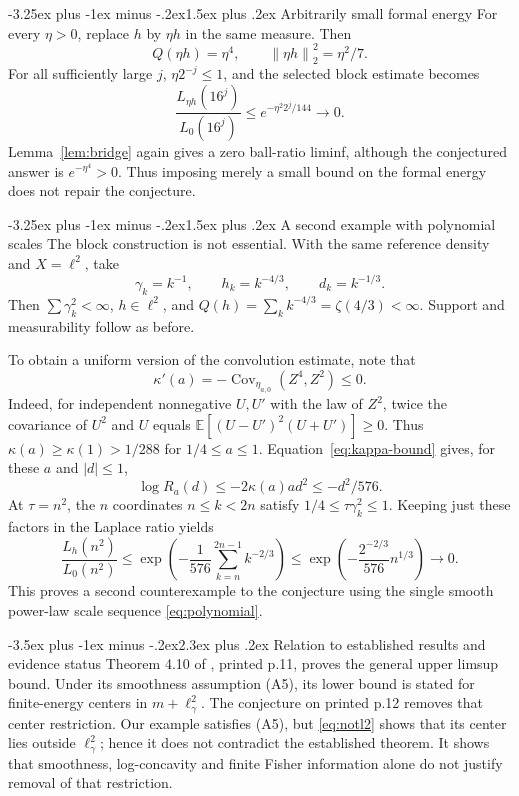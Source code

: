 \documentclass[11pt]{article}
\makeatletter
\renewcommand{\section}{\@startsection{section}{1}{0pt}
  {-3.5ex plus -1ex minus -.2ex}{2.3ex plus .2ex}
  {\normalfont\large\bfseries\color{MidnightBlue}}}
\renewcommand{\subsection}{\@startsection{subsection}{2}{0pt}
  {-3.25ex plus -1ex minus -.2ex}{1.5ex plus .2ex}
  {\normalfont\normalsize\bfseries}}
\theoremstyle{remark}
\newcommand{\E}{\mathbb E}
\newcommand{\norm}[1]{\left\lVert #1\right\rVert}
\newcommand{\Cov}{\operatorname{Cov}}
\makeatother
\begin{document}
\subsection{Arbitrarily small formal energy}
For every $\eta>0$, replace $h$ by $\eta h$ in the same measure. Then
\[
Q(\eta h)=\eta^4,\qquad \norm{\eta h}_2^2=\eta^2/7.
\]
For all sufficiently large $j$, $\eta2^{-j}\le1$, and the selected block estimate becomes
\[
\frac{L_{\eta h}(16^j)}{L_0(16^j)}\le e^{-\eta^2 2^j/144}\longrightarrow0.
\]
Lemma~\ref{lem:bridge} again gives a zero ball-ratio liminf, although the conjectured answer is $e^{-\eta^4}>0$. Thus imposing merely a small bound on the formal energy does not repair the conjecture.

\subsection{A second example with polynomial scales}
The block construction is not essential. With the same reference density and $X=\ell^2$, take
\begin{equation}\label{eq:polynomial}
\gamma_k=k^{-1},\qquad h_k=k^{-4/3},\qquad d_k=k^{-1/3}.
\end{equation}
Then $\sum\gamma_k^2<\infty$, $h\in\ell^2$, and $Q(h)=\sum_k k^{-4/3}=\zeta(4/3)<\infty$. Support and measurability follow as before.

To obtain a uniform version of the convolution estimate, note that
\[
\kappa'(a)=-\Cov_{\eta_{a,0}}(Z^4,Z^2)\le0.
\]
Indeed, for independent nonnegative $U,U'$ with the law of $Z^2$, twice the covariance of $U^2$ and $U$ equals
$\E[(U-U')^2(U+U')]\ge0$.
Thus $\kappa(a)\ge\kappa(1)>1/288$ for $1/4\le a\le1$.
Equation~\eqref{eq:kappa-bound} gives, for these $a$ and $|d|\le1$,
\begin{equation}\label{eq:uniform}
\log R_a(d)\le-2\kappa(a)ad^2\le-d^2/576.
\end{equation}
At $\tau=n^2$, the $n$ coordinates $n\le k<2n$ satisfy
$1/4\le\tau\gamma_k^2\le1$. Keeping just these factors in the Laplace ratio yields
\[
\frac{L_h(n^2)}{L_0(n^2)}
\le\exp\left(-\frac1{576}\sum_{k=n}^{2n-1}k^{-2/3}\right)
\le\exp\left(-\frac{2^{-2/3}}{576}n^{1/3}\right)\longrightarrow0.
\]
This proves a second counterexample to the conjecture using the single smooth power-law scale sequence \eqref{eq:polynomial}.

\section{Relation to established results and evidence status}
Theorem 4.10 of \cite{AKLS}, printed p.11, proves the general upper limsup bound. Under its smoothness assumption (A5), its lower bound is stated for finite-energy centers in $m+\ell^2_\gamma$. The conjecture on printed p.12 removes that center restriction. Our example satisfies (A5), but \eqref{eq:notl2} shows that its center lies outside $\ell^2_\gamma$; hence it does not contradict the established theorem. It shows that smoothness, log-concavity and finite Fisher information alone do not justify removal of that restriction.
\end{document}
